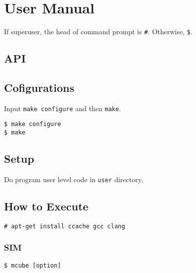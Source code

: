\section{User Manual}

If superuser, the head of command prompt is \verb|#|.
Otherwise, \verb|$|.


\subsection{API}


\subsection{Cofigurations}


Input \verb|make configure| and then \verb|make|.

\noindent
\begin{Sbox}
\begin{minipage}[t]{0.975\linewidth}
\begin{verbatim}
$ make configure
$ make
\end{verbatim}
\end{minipage}
\end{Sbox}
\fbox{\TheSbox}




\subsection{Setup}

Do program user level code in \verb|user| directory.


\subsection{How to Execute}

\noindent
\begin{Sbox}
\begin{minipage}[t]{0.975\linewidth}
\begin{verbatim}
# apt-get install ccache gcc clang
\end{verbatim}
\end{minipage}
\end{Sbox}
\fbox{\TheSbox}


\subsubsection{SIM}

\noindent
\begin{Sbox}
\begin{minipage}[t]{0.975\linewidth}
\begin{verbatim}
$ mcube [option]
\end{verbatim}
\end{minipage}
\end{Sbox}
\fbox{\TheSbox}


